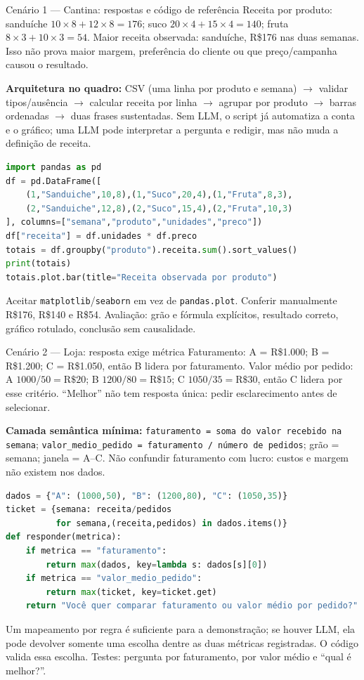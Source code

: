 \documentclass[10pt,a4paper]{article}
\begin{document}
\begin{chave}{Cenário 1 --- Cantina: respostas e código de referência}
Receita por produto: sanduíche $10\times8+12\times8=176$; suco $20\times4+15\times4=140$; fruta $8\times3+10\times3=54$. Maior receita observada: sanduíche, R\$176 nas duas semanas. Isso não prova maior margem, preferência do cliente ou que preço/campanha causou o resultado.

\textbf{Arquitetura no quadro:} CSV (uma linha por produto e semana) $\rightarrow$ validar tipos/ausência $\rightarrow$ calcular receita por linha $\rightarrow$ agrupar por produto $\rightarrow$ barras ordenadas $\rightarrow$ duas frases sustentadas. Sem LLM, o script já automatiza a conta e o gráfico; uma LLM pode interpretar a pergunta e redigir, mas não muda a definição de receita.

\begin{lstlisting}[language=Python]
import pandas as pd
df = pd.DataFrame([
    (1,"Sanduiche",10,8),(1,"Suco",20,4),(1,"Fruta",8,3),
    (2,"Sanduiche",12,8),(2,"Suco",15,4),(2,"Fruta",10,3)
], columns=["semana","produto","unidades","preco"])
df["receita"] = df.unidades * df.preco
totais = df.groupby("produto").receita.sum().sort_values()
print(totais)
totais.plot.bar(title="Receita observada por produto")
\end{lstlisting}
Aceitar \texttt{matplotlib}/\texttt{seaborn} em vez de \texttt{pandas.plot}. Conferir manualmente R\$176, R\$140 e R\$54. Avaliação: grão e fórmula explícitos, resultado correto, gráfico rotulado, conclusão sem causalidade.
\end{chave}

\begin{chave}{Cenário 2 --- Loja: resposta exige métrica}
Faturamento: A = R\$1.000; B = R\$1.200; C = R\$1.050, então B lidera por faturamento. Valor médio por pedido: A $1000/50=\text{R\$}20$; B $1200/80=\text{R\$}15$; C $1050/35=\text{R\$}30$, então C lidera por esse critério. ``Melhor'' não tem resposta única: pedir esclarecimento antes de selecionar.

\textbf{Camada semântica mínima:} \texttt{faturamento = soma do valor recebido na semana}; \texttt{valor\_medio\_pedido = faturamento / número de pedidos}; grão = semana; janela = A--C. Não confundir faturamento com lucro: custos e margem não existem nos dados.

\begin{lstlisting}[language=Python]
dados = {"A": (1000,50), "B": (1200,80), "C": (1050,35)}
ticket = {semana: receita/pedidos
          for semana,(receita,pedidos) in dados.items()}
def responder(metrica):
    if metrica == "faturamento":
        return max(dados, key=lambda s: dados[s][0])
    if metrica == "valor_medio_pedido":
        return max(ticket, key=ticket.get)
    return "Você quer comparar faturamento ou valor médio por pedido?"
\end{lstlisting}
Um mapeamento por regra é suficiente para a demonstração; se houver LLM, ela pode devolver somente uma escolha dentre as duas métricas registradas. O código valida essa escolha. Testes: pergunta por faturamento, por valor médio e ``qual é melhor?''.
\end{chave}
\end{document}
